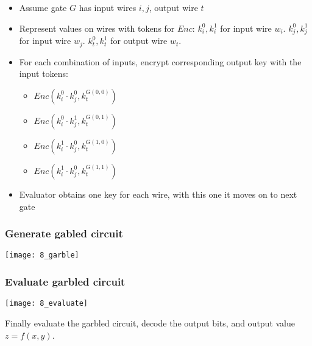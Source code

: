 \begin{itemize}
		\item Assume gate $G$ has input wires $i, j$, output wire $t$
		\item Represent values on wires with tokens for $Enc$: $k^0_i, k^1_i$
				for input wire $w_i$. $k^0_j, k^1_j$ for input wire $w_j$.
				$k^0_t, k^1_t$ for output wire $w_t$.
		\item For each combination of inputs, encrypt corresponding output key
				with the input tokens:
				\begin{itemize}
						\item $Enc(k^0_i \cdot k^0_j, k^{G(0, 0)}_t)$
						\item $Enc(k^0_i \cdot k^1_j, k^{G(0, 1)}_t)$
						\item $Enc(k^1_i \cdot k^0_j, k^{G(1, 0)}_t)$
						\item $Enc(k^1_i \cdot k^0_j, k^{G(1, 1)}_t)$
				\end{itemize}
		\item Evaluator obtains one key for each wire, with this one it moves
				on to next gate
\end{itemize}

\subsubsection{Generate gabled circuit}

\texttt{[image: 8\_garble]}

\subsubsection{Evaluate garbled circuit}

\texttt{[image: 8\_evaluate]}

Finally evaluate the garbled circuit, decode the output bits, and output value
$z = f(x, y)$.
